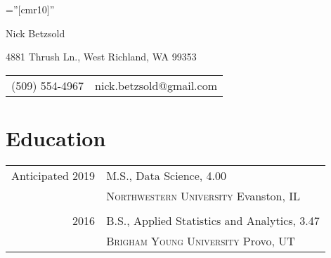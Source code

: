 \documentclass[a4paper,12pt]{article}
\begin{document}

\pagestyle{empty} %

\font\fb=''[cmr10]'' %

\par{\centering
		{\Huge Nick Betzsold
	}\par}

\par{\centering
    {4881 Thrush Ln., West Richland, WA 99353 \\
     \begin{tabular}{rl}
     (509) 554-4967 & nick.betzsold@gmail.com
     \end{tabular}
    }\par}

\section{Education}
\begin{tabular}{rp{11cm}}	
  Anticipated 2019 & M.S., Data Science, 4.00 \\
  & \textsc{Northwestern University} Evanston, IL \\ \\
  
  2016 & B.S., Applied Statistics and Analytics, 3.47 \\
  & \textsc{Brigham Young University} Provo, UT \\
\end{tabular}


\end{document}
